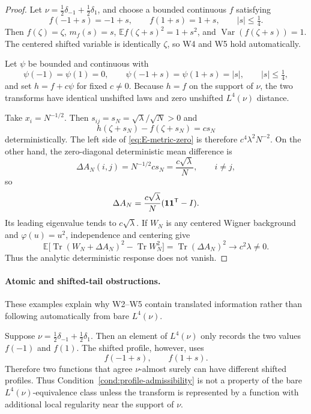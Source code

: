 \documentclass[11pt]{article}
\theoremstyle{definition}
\theoremstyle{remark}
\newcommand{\E}{\mathbb E}
\newcommand{\Var}{\operatorname{Var}}
\newcommand{\Tr}{\operatorname{Tr}}
\begin{document}
\begin{proof}
Let \(\nu=\frac12\delta_{-1}+\frac12\delta_1\), and choose a bounded continuous \(f\) satisfying
\[
        f(-1+s)=-1+s,
        \qquad
        f(1+s)=1+s,
        \qquad |s|\le\tfrac14.
\]
Then \(f(\zeta)=\zeta\), \(m_f(s)=s\), \(\E f(\zeta+s)^2=1+s^2\), and \(\Var(f(\zeta+s))=1\).  The centered shifted variable is identically \(\zeta\), so W4 and W5 hold automatically.

Let \(\psi\) be bounded and continuous with
\[
        \psi(-1)=\psi(1)=0,
        \qquad
        \psi(-1+s)=\psi(1+s)=|s|,
        \qquad |s|\le\tfrac14,
\]
and set \(h=f+c\psi\) for fixed \(c\ne0\).  Because \(h=f\) on the support of \(\nu\), the two transforms have identical unshifted laws and zero unshifted \(L^4(\nu)\) distance.

Take \(x_i=N^{-1/2}\).  Then \(s_{ij}=s_N=\sqrt\lambda/\sqrt N>0\) and
\[
        h(\zeta+s_N)-f(\zeta+s_N)=cs_N
\]
deterministically.  The left side of \eqref{eq:E-metric-zero} is therefore \(c^4\lambda^2N^{-2}\).  On the other hand, the zero-diagonal deterministic mean difference is
\[
        \Delta A_N(i,j)=N^{-1/2}cs_N=\frac{c\sqrt\lambda}{N},
        \qquad i\ne j,
\]
so
\[
        \Delta A_N=\frac{c\sqrt\lambda}{N}
        ({\bf 1}{\bf 1}^{\mathsf T}-I).
\]
Its leading eigenvalue tends to \(c\sqrt\lambda\).  If \(W_N\) is any centered Wigner background and \(\varphi(u)=u^2\), independence and centering give
\[
        \E\bigl[\Tr(W_N+\Delta A_N)^2-\Tr W_N^2\bigr]
        =\Tr(\Delta A_N)^2\longrightarrow c^2\lambda\ne0.
\]
Thus the analytic deterministic response does not vanish.
\end{proof}

\paragraph{Atomic and shifted-tail obstructions.}
These examples explain why W2--W5 contain translated information rather than following automatically from bare \(L^4(\nu)\).


Suppose \(\nu=\frac12\delta_{-1}+\frac12\delta_1\).  Then an element of \(L^4(\nu)\) only records the two values \(f(-1)\) and \(f(1)\).  The shifted profile, however, uses
\[
        f(-1+s),
        \qquad
        f(1+s).
\]
Therefore two functions that agree \(\nu\)-almost surely can have different shifted profiles.  Thus Condition~\ref{cond:profile-admissibility} is not a property of the bare \(L^4(\nu)\)-equivalence class unless the transform is represented by a function with additional local regularity near the support of \(\nu\).
\end{document}
